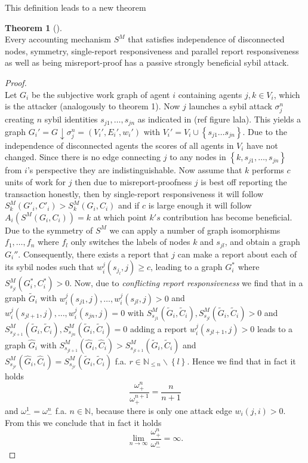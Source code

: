 \documentclass[11pt,a4paper]{report}
\theoremstyle{definition}
\theoremstyle{theorem}
\newtheorem{theorem}{Theorem}[section]
\theoremstyle{proposition}
\theoremstyle{corollary}
\theoremstyle{lemma}
\theoremstyle{example}
\theoremstyle{remark}
\begin{document}
This definition leads to a new theorem
\begin{theorem}[]\ \\
Every accounting mechanism $S^M$ that satisfies independence of disconnected nodes, symmetry, single-report responsiveness and parallel report responsiveness as well as being misreport-proof has a passive strongly beneficial sybil attack. 
\end{theorem}
\begin{proof}\ \\
Let $G_i$ be the subjective work graph of agent $i$ containing agents $j,k\in{}V_i$, which is the attacker (analogously to theorem 1). Now $j$ launches a sybil attack $\sigma_j^n$ creating $n$ sybil identities $s_{j1},\ldots,s_{jn}$ as indicated in (ref figure lala). This yields a graph $G_i'=G\downarrow\sigma^n_j=(V_i',E_i',w_i')$ with $V_i'=V_i\cup\left\lbrace{}s_{j1}\ldots{}s_{jn}\right\rbrace$. Due to the independence of disconnected agents the scores of all agents in $V_i$ have not changed. Since there is no edge connecting $j$ to any nodes in $\left\lbrace{}k,s_{j1},\ldots,s_{jn}\right\rbrace$ from $i$'s perspective they are indistinguishable. Now assume that $k$ performs $c$ units of work for $j$ then due to misreport-proofness $j$ is best off reporting the transaction honestly, then by single-report responsiveness it will follow $S^M_k(G'_i,C'_i)>S^M_k(G_i,C_i)$ and if $c$ is large enough it will follow $A_i(S^M(G_i,C_i))=k$ at which point $k's$ contribution has become beneficial. Due to the symmetry of $S^M$ we can apply a number of graph isomorphisms $f_1,\ldots,f_n$ where $f_l$ only switches the labels of nodes $k$ and $s_{jl}$, and obtain a graph $G_i''$. Consequently, there exists a report that $j$ can make a report about each of its sybil nodes such that $w_i^j(s_{j_l},j)\geq{}c$, leading to a graph $G_i^{*}$ where $S^M_{s_{jl}}(G_i^{*},C_i^{*})>0$. Now, due to {\it conflicting report responsiveness} we find that in a graph $\tilde{G}_i$ with $w_i^j(s_{j1},j),\ldots,w_i^j(s_{jl},j)>0$ and $w_i^j(s_{jl+1},j),\ldots,w_i^j(s_{jn},j)=0$ with $S^M_{s_{j1}}(\tilde{G}_i,\tilde{C}_i),S^M_{s_{jl}}(\tilde{G}_i,\tilde{C}_i)>0$ and $S^M_{s_{jl+1}}(\tilde{G}_i,\tilde{C}_i),S^M_{s_{jn}}(\tilde{G}_i,\tilde{C}_i)=0$ adding a report $w_i^j(s_{jl+1},j)>0$ leads to a graph $\hat{G}_i$ with $S^M_{s_{jl+1}}(\hat{G}_i,\hat{C}_i)>S^M_{s_{jl+1}}(\tilde{G}_i,\tilde{C}_i)$ and $S^M_{s_{jr}}(\hat{G}_i,\hat{C}_i)=S^M_{s_{jr}}(\tilde{G}_i,\tilde{C}_i)$ f.a. $r\in\mathbb{N}_{\leq{}n}\backslash\left\lbrace{}l\right\rbrace$. Hence we find that in fact it holds
\[
\frac{\omega_{+}^n}{\omega_{+}^{n+1}}=\frac{n}{n+1}
\]
and $\omega_{-}^1=\omega_{-}^n$ f.a. $n\in\mathbb{N}$, because there is only one attack edge $w_i(j,i)>0$. From this we conclude that in fact it holds
\[
\lim\limits_{n\rightarrow\infty}\frac{\omega^n_{+}}{\omega^n_{-}}=\infty.
\]
\end{proof}
\end{document}
